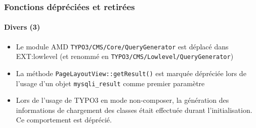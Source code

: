 \begin{frame}[fragile]
	\frametitle{Fonctions dépréciées et retirées}
	\framesubtitle{Divers (3)}

	\begin{itemize}

		\item Le module AMD \texttt{TYPO3/CMS/Core/QueryGenerator} est déplacé dans EXT:lowlevel\newline
			\small
				(et renommé en \texttt{TYPO3/CMS/Lowlevel/QueryGenerator})
			\normalsize

		\item La méthode \texttt{PageLayoutView::getResult()} est marquée dépréciée lors de
			l'usage d'un objet \texttt{mysqli\_result} comme premier paramètre

		\item Lors de l'usage de TYPO3 en mode non-composer, la génération des informations
			de chargement des classes était effectuée durant l'initialisation. Ce comportement
			est déprécié.
	\end{itemize}

\end{frame}

